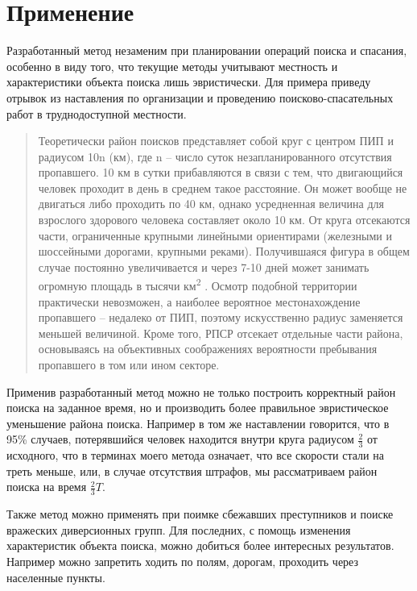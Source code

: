 \chapter{Применение}

Разработанный метод незаменим при планировании операций
поиска и спасания, особенно в виду того, что текущие
методы учитывают местность и характеристики объекта поиска
лишь эвристически. Для примера приведу отрывок из наставления
по организации и проведению поисково-спасательных работ в
труднодоступной местности\cite{SAR}.

\begin{quotation}
Теоретически район поисков представляет собой круг с центром ПИП и радиусом 10n
(км), где n – число суток незапланированного отсутствия пропавшего. 10 км в сутки
прибавляются в связи с тем, что двигающийся человек проходит в день в среднем такое
расстояние. Он может вообще не двигаться либо проходить по 40 км, однако усредненная
величина для взрослого здорового человека составляет около 10 км.
От круга отсекаются части, ограниченные крупными линейными ориентирами
(железными и шоссейными дорогами, крупными реками). Получившаяся фигура в общем
случае постоянно увеличивается и через 7-10 дней может занимать огромную площадь в
тысячи км\textsuperscript{2} .
Осмотр подобной территории практически невозможен, а наиболее вероятное
местонахождение пропавшего – недалеко от ПИП, поэтому искусственно радиус заменяется
меньшей величиной. Кроме того, РПСР отсекает отдельные части района, основываясь на
объективных соображениях вероятности пребывания пропавшего в том или ином секторе.
\end{quotation}

Применив разработанный метод можно не только построить корректный район поиска
на заданное время, но и производить более правильное
эвристическое уменьшение района поиска.
Например в том же наставлении\cite{SAR} говорится, что в 95\% случаев,
потерявшийся человек находится внутри круга радиусом $\frac{2}{3}$
от исходного, что в терминах моего метода означает, что все скорости
стали на треть меньше, или, в случае отсутствия штрафов, мы рассматриваем
район поиска на время $\frac{2}{3}T$.

Также метод можно применять при поимке сбежавших преступников и поиске
вражеских диверсионных групп. Для последних, с помощь изменения
характеристик объекта поиска, можно добиться более интересных
результатов. Например можно запретить ходить по полям, дорогам,
проходить через населенные пункты.

\FloatBarrier
